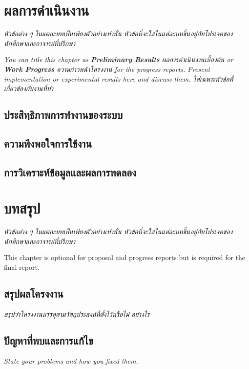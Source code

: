 \documentclass[12pt,oneside,openright,a4paper]{cpe-thai-project}
\begin{document}
\chapter{ผลการดำเนินงาน}


\emph{หัวข้อต่าง ๆ ในแต่ละบทเป็นเพียงตัวอย่างเท่านั้น หัวข้อที่จะใส่ในแต่ละบทขึ้นอยู่กับโปรเจคของนักศึกษาและอาจารย์ที่ปรึกษา}

\emph{
    You can title this chapter as \textbf{Preliminary Results} ผลการดำเนินงานเบื้องต้น or \textbf{Work Progress} ความก้าวหน้าโครงงาน for the progress reports. Present implementation or experimental results here and discuss them.
    ใส่เฉพาะหัวข้อที่เกี่ยวข้องกับงานที่ทำ 
}

\section{ประสิทฺธิภาพการทำงานของระบบ} 
\section{ความพึงพอใจการใช้งาน}
\section{การวิเคราะห์ข้อมูลและผลการทดลอง}

\chapter{บทสรุป}


\emph{หัวข้อต่าง ๆ ในแต่ละบทเป็นเพียงตัวอย่างเท่านั้น หัวข้อที่จะใส่ในแต่ละบทขึ้นอยู่กับโปรเจคของนักศึกษาและอาจารย์ที่ปรึกษา}

This chapter is optional for proposal and progress reports but 
is required for the final report.

\section{สรุปผลโครงงาน}
    \emph{
        สรุปว่าโครงงานบรรลุตามวัตถุประสงค์ที่ตั้งไว้หรือไม่ อย่างไร   
    }

\section{ปัญหาที่พบและการแก้ไข}
    \emph{
        State your problems and how you fixed them.
    }
\end{document}
